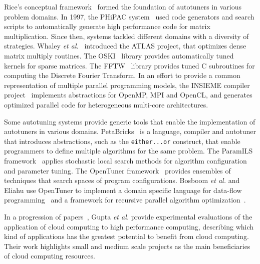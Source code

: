 \documentclass[12pt]{article}
\begin{document}
Rice's conceptual framework~\cite{rice1976algorithm} formed the foundation
of autotuners in various problem domains.  In 1997, the PHiPAC
system~\cite{bilmes1997phipac} used code generators and search scripts to
automatically generate high performance code
for matrix multiplication. Since then, systems tackled different domains with a
diversity of strategies. Whaley \emph{et al.}~\cite{whaley1998atlas} introduced
the ATLAS project, that optimizes dense matrix multiply routines. The
OSKI~\cite{vuduc2005oski} library provides automatically tuned kernels for
sparse matrices. The FFTW~\cite{frigo1998fftw} library provides tuned C
subroutines for computing the Discrete Fourier Transform.  In an effort to
provide a common representation of multiple parallel programming models, the
INSIEME compiler project~\cite{jordan2012multi} implements abstractions for
OpenMP, MPI and OpenCL, and generates optimized parallel code for heterogeneous
multi-core architectures.

Some autotuning systems provide generic tools that enable the implementation of
autotuners in various domains. PetaBricks~\cite{ansel2009petabricks} is a
language, compiler and autotuner that introduces abstractions, such as the
\texttt{\footnotesize either...or} construct, that enable programmers to define
multiple algorithms for the same problem.  The ParamILS
framework~\cite{hutter2009paramils} applies stochastic local search methods
for algorithm configuration and parameter tuning.  The OpenTuner
framework~\cite{ansel2014opentuner} provides ensembles of techniques that
search spaces of program configurations. Bosboom \emph{et al.} and Eliahu use
OpenTuner to implement a domain specific language for data-flow
programming~\cite{bosboom2014streamjit} and a framework for recursive parallel
algorithm optimization~\cite{eliahu2015frpa}.

In a progression of papers~\cite{gupta2012exploring,gupta2014evaluating,gupta2013hpccloud},
Gupta \emph{et al.} provide experimental evaluations of the application of
cloud computing to high performance computing, describing which kind of
applications has the greatest potential to benefit from cloud computing.
Their work highlights small and medium scale projects as the main beneficiaries
of cloud computing resources.

\end{document}
